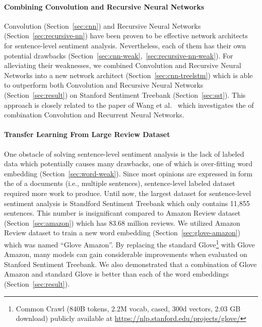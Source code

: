 \paragraph{Combining Convolution and Recursive Neural Networks}Convolution (Section~\ref{sec:cnn}) and Recursive Neural Networks (Section~\ref{sec:recursive-nn}) have been proven to be effective network architects for sentence-level sentiment analysis.
Nevertheless, each of them has their own potential drawbacks (Section~\ref{sec:cnn-weak},~\ref{sec:recursive-nn-weak}).
For alleviating their weaknesses, we combined Convolution and Recursive Neural Networks into a new network architect (Section~\ref{sec:cnn-treelstm}) which is able to outperform both Convolution and Recursive Neural Networks (Section~\ref{sec:result}) on Stanford Sentiment Treebank (Section~\ref{sec:sst}).
This approach is closely related to the paper of Wang et al.~\cite{cnn-rnn} which investigates the of combination Convolution and Recurrent Neural Networks.
\paragraph{Transfer Learning From Large Review Dataset} One obstacle of solving sentence-level sentiment analysis is the lack of labeled data which potentially causes many drawbacks, one of which is over-fitting word embedding (Section~\ref{sec:word-weak}).
Since most opinions are expressed in form the of  a documents (i.e., multiple sentences), sentence-level labeled dataset required more work to produce.
Until now, the largest dataset for sentence-level sentiment analysis is Standford Sentiment Treebank which only contains 11,855 sentences.
This number is insignificant compared to Amazon Review dataset (Section~\ref{sec:amazon}) which has 83.68 million reviews.
We utilized Amazon Review dataset to train a new word embedding (Section~\ref{sec:glove-amazon}) which was named ``Glove Amazon''.
By replacing the standard Glove\footnote{Common Crawl (840B tokens, 2.2M vocab, cased, 300d vectors, 2.03 GB download) publicly available at \url{https://nlp.stanford.edu/projects/glove/}} with Glove Amazon, many models can gain considerable improvements when evaluated on Stanford Sentiment Treebank.
We also demonstrated that a combination of Glove Amazon and standard Glove is better than each of the word embeddings (Section~\ref{sec:result}).